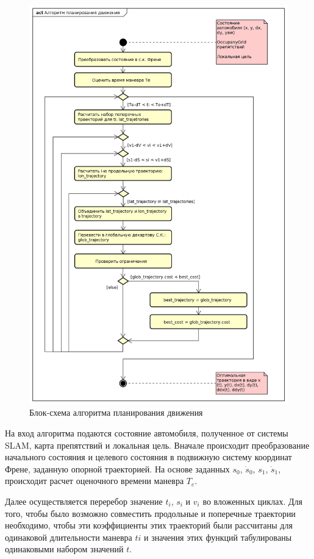 \begin{figure}[p]
      \centering
      \includegraphics[height=0.95\textheight]{images/alg_quntic_planning_1}
      \caption{Блок-схема алгоритма планирования движения}
      \label{img:alg_quntic_planning_1}
\end{figure}

На вход алгоритма подаются состояние автомобиля, полученное от системы SLAM, карта препятствий и локальная цель.
Вначале происходит преобразование начального состояния и целевого состояния в подвижную систему координат Френе,
заданную опорной траекторией. На основе заданных $s_0$, $\dot{s}_0$, $s_1$, $\dot{s}_1$, происходит расчет оценочного
времени маневра $T_e$.

Далее осуществляется переребор значение $t_i$, $s_i$ и $v_i$ во вложенных циклах. Для того, чтобы было возможно
совместить продольные и поперечные траектории необходимо, чтобы эти коэффициенты этих траекторий были рассчитаны для
одинаковой длительности маневра $ti$ и значения этих функций табулированы одинаковыми набором значений $t$.

